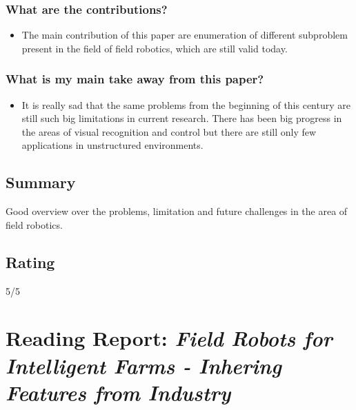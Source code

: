 \subsubsection*{What are the contributions?}
\begin{itemize}
    \item The main contribution of this paper are enumeration of different subproblem present in the field of field robotics, which are still valid today.
\end{itemize}
\subsubsection*{What is my main take away from this paper?}
\begin{itemize}
    \item It is really sad that the same problems from the beginning of this century are still such big limitations in current research. There has been big progress in the areas of visual recognition and control but there are still only few applications in unstructured environments.
\end{itemize}

\subsection*{Summary}
Good overview over the problems, limitation and future challenges in the area of field robotics.
\subsection*{Rating}
5/5

\section{Reading Report: \emph{Field Robots for Intelligent Farms - Inhering Features from Industry}}
\cite{deSantos2020}

